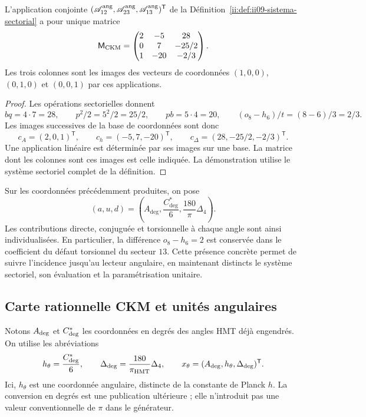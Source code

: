 \begin{theorem}
\label{ii:thm:ii09-matriz-sectorial}
L'application conjointe
\((\mathscr A_{12}^{\rm ang},\mathscr A_{23}^{\rm ang},
\mathscr A_{13}^{\rm ang})^{\mathsf T}\) de la
Définition~\ref{ii:def:ii09-sistema-sectorial} a pour unique matrice
\[
 \mathsf M_{\rm CKM}=
 \begin{pmatrix}
 2&-5&28\\
 0&7&-25/2\\
 1&-20&-2/3
 \end{pmatrix}.
\]
Les trois colonnes sont les images des vecteurs de coordonnées
\((1,0,0)\), \((0,1,0)\) et \((0,0,1)\) par ces applications.
\end{theorem}
\begin{proof}
Les opérations sectorielles donnent
\[
 bq=4\cdot7=28,\qquad p^2/2=5^2/2=25/2,
 \qquad pb=5\cdot4=20,\qquad
 (o_8-h_6)/t=(8-6)/3=2/3.
\]
Les images successives de la base de coordonnées sont donc
\[
 c_A=(2,0,1)^{\mathsf T},\qquad
 c_h=(-5,7,-20)^{\mathsf T},\qquad
 c_\Delta=(28,-25/2,-2/3)^{\mathsf T}.
\]
Une application linéaire est déterminée par ses images sur une
base. La matrice dont les colonnes sont ces images est celle indiquée.
La démonstration utilise le système sectoriel complet de la définition.
\end{proof}

Sur les coordonnées précédemment produites, on pose
\[
 (a,u,d)=\left(A_{\deg},\frac{C^*_{\deg}}6,
                       \frac{180}{\pi}\Delta_4\right).
\]
Les contributions directe, conjuguée et torsionnelle à chaque angle
sont ainsi individualisées. En particulier, la différence
\(o_8-h_6=2\) est conservée dans le coefficient du défaut torsionnel
du secteur \(13\). Cette présence concrète permet de suivre
l'incidence jusqu'au lecteur angulaire, en maintenant distincts le
système sectoriel, son évaluation et la paramétrisation unitaire.



\subsection{Carte rationnelle CKM et unités angulaires}

Notons \(A_{\rm deg}\) et \(C^*_{\rm deg}\) les coordonnées en
degrés des angles HMT déjà engendrés. On utilise les abréviations
\begin{equation}
 h_\theta=\frac{C^*_{\rm deg}}6,
 \qquad
 \Delta_{\rm deg}=\frac{180}{\pi_{\rm HMT}}\Delta_4,
 \qquad
 x_\theta=(A_{\rm deg},h_\theta,\Delta_{\rm deg})^{\mathsf T}.
 \label{ii:eq:ii-angular-chart}
\end{equation}
Ici, \(h_\theta\) est une coordonnée angulaire, distincte de la constante de
Planck \(h\). La conversion en degrés est une publication ultérieure ; elle
n'introduit pas une valeur conventionnelle de \(\pi\) dans le générateur.

